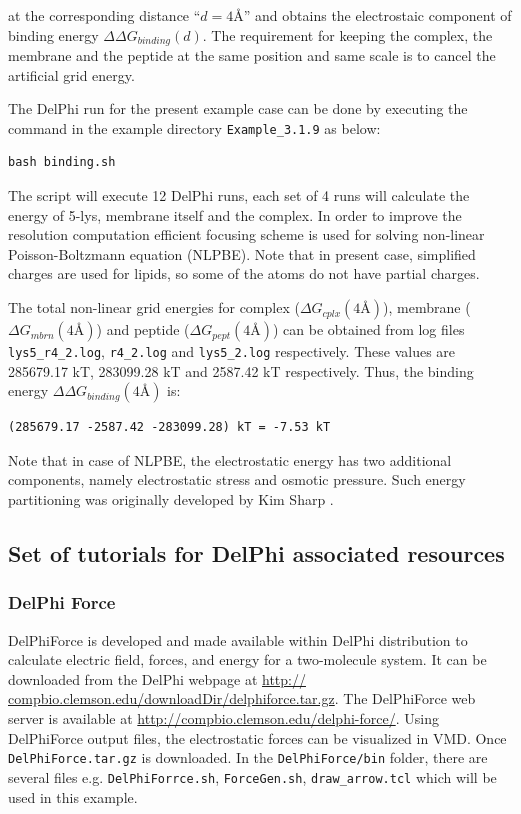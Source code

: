 \documentclass[9pt,tutorial]{livecoms}
\begin{document}
at the corresponding distance ``$ d = 4 \text{\AA} $'' and obtains the electrostaic component of binding energy $ \Delta\Delta G_{binding}(d) $. The requirement for keeping the complex, the membrane and the peptide at the same position and same scale is to cancel the artificial grid energy.

The DelPhi run for the present example case can be done by executing the command in the example directory \texttt{Example\_3.1.9} as below:
\begin{verbatim}
bash binding.sh
\end{verbatim} 

The script will execute 12 DelPhi runs, each set of 4 runs will calculate the energy of 5-lys, membrane itself and the complex. In order to improve the resolution computation efficient focusing scheme is used for solving non-linear Poisson-Boltzmann equation (NLPBE). Note that in present case, simplified charges are used for lipids, so some of the atoms do not have partial charges.

The total non-linear grid energies for complex ($ \Delta G_{cplx}(4 \text{\AA}) $), membrane ($ \Delta G_{mbrn}(4 \text{\AA}) $) and peptide ($ \Delta G_{pept}(4 \text{\AA}) $) can be obtained from log files \texttt{lys5\_r4\_2.log}, \texttt{r4\_2.log} and \texttt{lys5\_2.log} respectively. These values are 285679.17 kT, 283099.28 kT and 2587.42 kT respectively. Thus, the binding energy $\Delta\Delta G_{binding}(4 \text{\AA}) $ is:

\begin{verbatim}
(285679.17 -2587.42 -283099.28) kT = -7.53 kT
\end{verbatim}

Note that in case of NLPBE, the electrostatic energy has two additional components, namely electrostatic stress and osmotic pressure. Such energy partitioning was originally developed by Kim Sharp \cite{sharp1990calculating}.

\subsection{Set of tutorials for DelPhi associated resources}

\subsubsection{DelPhi Force}

DelPhiForce\cite{li2017delphiforce} is developed and made available within DelPhi distribution to calculate electric field, forces, and energy for a two-molecule system. It can be downloaded from the DelPhi webpage at \url{http:// compbio.clemson.edu/downloadDir/delphiforce.tar.gz}. The DelPhiForce web server is available at \url{http://compbio.clemson.edu/delphi-force/}. Using DelPhiForce output files, the electrostatic forces can be visualized in VMD\cite{humphrey1996vmd}. Once \texttt{DelPhiForce.tar.gz} is downloaded. In the \texttt{DelPhiForce/bin} folder, there are several files e.g. 
\texttt{DelPhiForrce.sh}, \texttt{ForceGen.sh}, \texttt{draw\_arrow.tcl} which will be used in this example.
\end{document}
